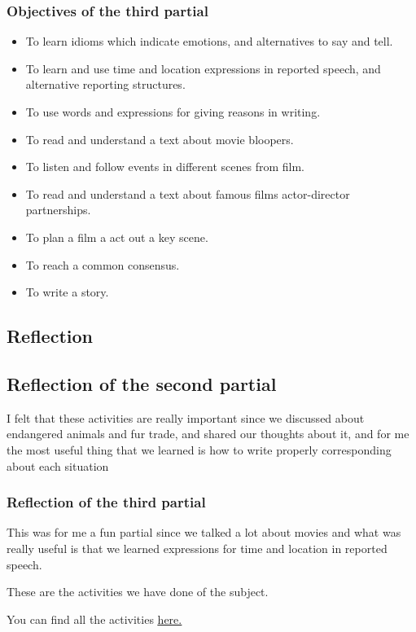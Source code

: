 \documentclass[a4paper, 12pt]{article}
\begin{document}
\subsubsection{Objectives of the third partial}
\begin{itemize}
  \item To learn idioms which indicate emotions, and alternatives to say and tell.
  \item To learn and use time and location expressions in reported speech, and alternative reporting structures.
  \item To use words and expressions for giving reasons in writing.
  \item To read and understand a text about movie bloopers.
  \item To listen and follow events in different scenes from film.
  \item To read and understand a text about famous films actor-director partnerships.
  \item To plan a film a act out a key scene.
  \item To reach a common consensus.
  \item To write a story.
\end{itemize}

\subsection{Reflection}

\subsection{Reflection of the second partial}
I felt that these activities are really important since we discussed about endangered animals and fur trade, and shared our thoughts about it, and for me the most useful thing that we learned is how to write properly corresponding about each situation

\subsubsection{Reflection of the third partial}
This was for me a fun partial since we talked a lot about movies and what was really useful is that we learned expressions for time and location in reported speech.

These are the activities we have done of the subject.

You can find all the activities \href{https://drive.google.com/drive/folders/1WlRihNI9a31q6NQNiywX2xcR9loMw0VV?usp=sharing}{\underline{here.}}
\end{document}
